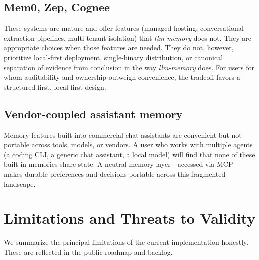 \documentclass[11pt,a4paper]{article}
\begin{document}
\subsection{Mem0, Zep, Cognee}

These systems are mature and offer features (managed hosting, conversational extraction pipelines, multi-tenant isolation) that \textit{llm-memory} does not. They are appropriate choices when those features are needed. They do not, however, prioritize local-first deployment, single-binary distribution, or canonical separation of evidence from conclusion in the way \textit{llm-memory} does. For users for whom auditability and ownership outweigh convenience, the tradeoff favors a structured-first, local-first design.

\subsection{Vendor-coupled assistant memory}

Memory features built into commercial chat assistants are convenient but not portable across tools, models, or vendors. A user who works with multiple agents (a coding CLI, a generic chat assistant, a local model) will find that none of these built-in memories share state. A neutral memory layer---accessed via MCP---makes durable preferences and decisions portable across this fragmented landscape.

\section{Limitations and Threats to Validity}

We summarize the principal limitations of the current implementation honestly. These are reflected in the public roadmap and backlog.
\end{document}
